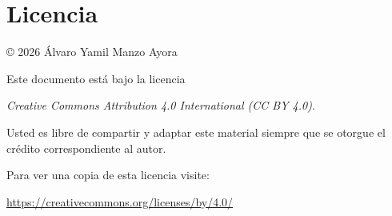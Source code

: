 \documentclass[12pt,final]{report}
\theoremstyle{plain}
\theoremstyle{definition}
\begin{document}
\chapter*{Licencia}

© 2026 Álvaro Yamil Manzo Ayora

Este documento está bajo la licencia

\textit{Creative Commons Attribution 4.0 International (CC BY 4.0)}.

Usted es libre de compartir y adaptar este material siempre que se otorgue el crédito correspondiente al autor.

Para ver una copia de esta licencia visite:

\begin{center}
\url{https://creativecommons.org/licenses/by/4.0/}
\end{center}
\end{document}
